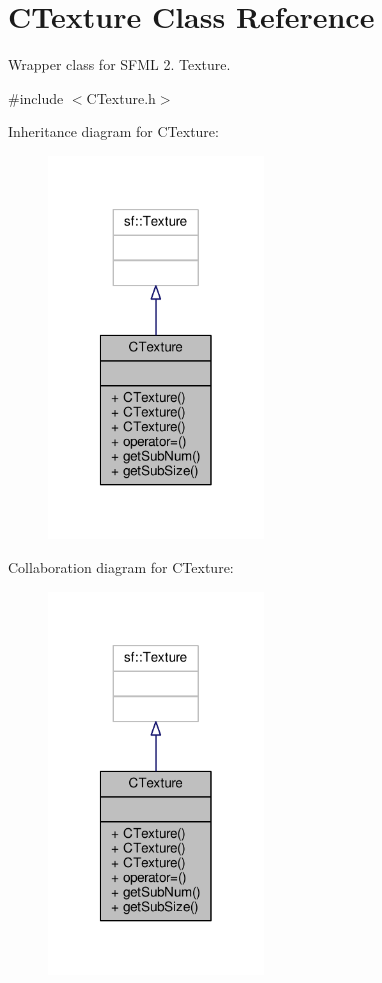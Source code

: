 \hypertarget{classCTexture}{\section{C\-Texture Class Reference}
\label{classCTexture}
}


Wrapper class for S\-F\-M\-L 2. Texture.  




{\ttfamily \#include $<$C\-Texture.\-h$>$}



Inheritance diagram for C\-Texture\-:\nopagebreak
\begin{figure}[H]
\begin{center}
\leavevmode
\includegraphics[width=162pt]{classCTexture__inherit__graph}
\end{center}
\end{figure}


Collaboration diagram for C\-Texture\-:\nopagebreak
\begin{figure}[H]
\begin{center}
\leavevmode
\includegraphics[width=162pt]{classCTexture__coll__graph}
\end{center}
\end{figure}
